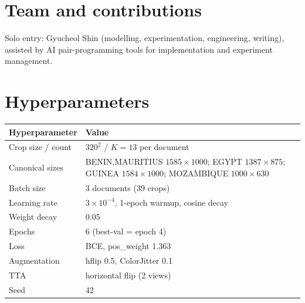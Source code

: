 \documentclass[11pt,a4paper]{article}
\begin{document}
\section{Team and contributions}
Solo entry: Gyucheol Shin (modelling, experimentation, engineering, writing),
assisted by AI pair-programming tools for implementation and experiment
management.




\appendix
\section{Hyperparameters}
\label{app:hparams}
\begin{table}[h]
  \centering
  \small
  \begin{tabular}{ll}
    \toprule
    Hyperparameter & Value \\
    \midrule
    Crop size / count & $320^2$ / $K{=}13$ per document \\
    Canonical sizes & BENIN,MAURITIUS $1585{\times}1000$; EGYPT $1387{\times}875$; GUINEA $1584{\times}1000$; MOZAMBIQUE $1000{\times}630$ \\
    Batch size & 3 documents (39 crops) \\
    Learning rate & $3\times10^{-4}$, 1-epoch warmup, cosine decay \\
    Weight decay & 0.05 \\
    Epochs & 6 (best-val = epoch 4) \\
    Loss & BCE, pos\_weight 1.363 \\
    Augmentation & hflip 0.5, ColorJitter 0.1 \\
    TTA & horizontal flip (2 views) \\
    Seed & 42 \\
    \bottomrule
  \end{tabular}
\end{table}
\end{document}

